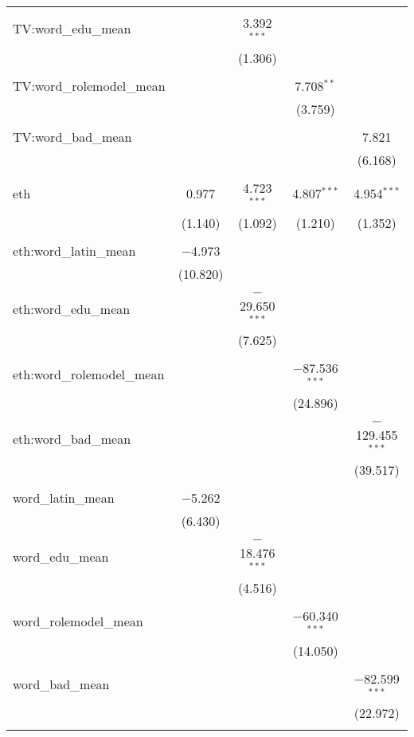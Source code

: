 \begin{table}[!htbp]
\begin{tabular}{@{\extracolsep{-2pt}}lcccc}
  & & & & \\ 
 TV:word\_edu\_mean &  & 3.392$^{***}$ &  &  \\ 
  &  & (1.306) &  &  \\ 
  & & & & \\ 
 TV:word\_rolemodel\_mean &  &  & 7.708$^{**}$ &  \\ 
  &  &  & (3.759) &  \\ 
  & & & & \\ 
 TV:word\_bad\_mean &  &  &  & 7.821 \\ 
  &  &  &  & (6.168) \\ 
  & & & & \\ 
 eth & 0.977 & 4.723$^{***}$ & 4.807$^{***}$ & 4.954$^{***}$ \\ 
  & (1.140) & (1.092) & (1.210) & (1.352) \\ 
  & & & & \\ 
 eth:word\_latin\_mean & $-$4.973 &  &  &  \\ 
  & (10.820) &  &  &  \\ 
  & & & & \\ 
 eth:word\_edu\_mean &  & $-$29.650$^{***}$ &  &  \\ 
  &  & (7.625) &  &  \\ 
  & & & & \\ 
 eth:word\_rolemodel\_mean &  &  & $-$87.536$^{***}$ &  \\ 
  &  &  & (24.896) &  \\ 
  & & & & \\ 
 eth:word\_bad\_mean &  &  &  & $-$129.455$^{***}$ \\ 
  &  &  &  & (39.517) \\ 
  & & & & \\ 
 word\_latin\_mean & $-$5.262 &  &  &  \\ 
  & (6.430) &  &  &  \\ 
  & & & & \\ 
 word\_edu\_mean &  & $-$18.476$^{***}$ &  &  \\ 
  &  & (4.516) &  &  \\ 
  & & & & \\ 
 word\_rolemodel\_mean &  &  & $-$60.340$^{***}$ &  \\ 
  &  &  & (14.050) &  \\ 
  & & & & \\ 
 word\_bad\_mean &  &  &  & $-$82.599$^{***}$ \\ 
  &  &  &  & (22.972) \\ 
  & & & & \\ 

\end{tabular}
\end{table}
